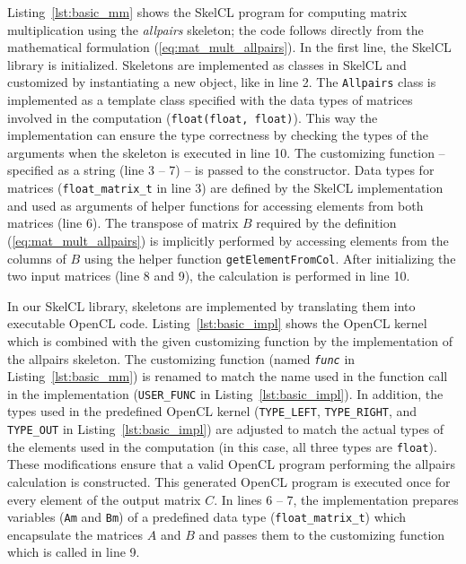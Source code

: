 Listing~\ref{lst:basic_mm} shows the SkelCL program for computing matrix multiplication using the \emph{allpairs} skeleton;
the code follows directly from the mathematical formulation (\ref{eq:mat_mult_allpairs}).
In the first line, the SkelCL library is initialized.
Skeletons are implemented as classes in SkelCL and customized by instantiating a new object, like in line 2.
The \texttt{Allpairs} class is implemented as a template class specified with the data types of matrices involved in the computation (\texttt{float(float, float)}).
This way the implementation can ensure the type correctness by checking the types of the arguments when the skeleton is executed in line 10.
The customizing function -- specified as a string (line 3 -- 7) -- is passed to the constructor.
Data types for matrices (\texttt{float\_matrix\_t} in line 3) are defined by the SkelCL implementation and used as arguments of helper functions for accessing elements from both matrices (line 6).
The transpose of matrix $B$ required by the definition (\ref{eq:mat_mult_allpairs}) is implicitly performed by accessing elements from the columns of $B$ using the helper function \texttt{getElementFromCol}.
After initializing the two input matrices (line 8 and 9), the calculation is performed in line 10.

In our SkelCL library, skeletons are implemented by translating them into executable OpenCL code.
Listing~\ref{lst:basic_impl} shows the OpenCL kernel which is combined with the given customizing function by the implementation of the allpairs skeleton.
The customizing function (named \texttt{\emph{func}} in Listing~\ref{lst:basic_mm}) is renamed to match the name used in the function call in the implementation (\texttt{USER\_FUNC} in Listing~\ref{lst:basic_impl}).
In addition, the types used in the predefined OpenCL kernel (\texttt{TYPE\_LEFT}, \texttt{TYPE\_RIGHT}, and \texttt{TYPE\_OUT} in Listing~\ref{lst:basic_impl}) are adjusted to match the actual types of the elements used in the computation (in this case, all three types are \texttt{float}).
These modifications ensure that a valid OpenCL program performing the allpairs calculation is constructed.
This generated OpenCL program is executed once for every element of the output matrix $C$.
In lines 6 -- 7, the implementation prepares variables (\texttt{Am} and \texttt{Bm}) of a predefined data type (\texttt{float\_matrix\_t}) which encapsulate the matrices $A$ and $B$ and passes them to the customizing function which is called in line 9.


